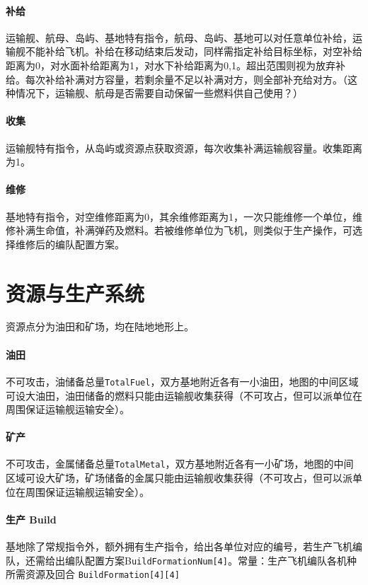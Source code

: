 \documentclass[11pt,a4paper]{article}
\begin{document}
      \paragraph{补给}
        运输舰、航母、岛屿、基地特有指令，航母、岛屿、基地可以对任意单位补给，运输舰不能补给飞机。补给在移动结束后发动，同样需指定补给目标坐标，对空补给距离为0，对水面补给距离为1，对水下补给距离为0,1。超出范围则视为放弃补给。每次补给补满对方容量，若剩余量不足以补满对方，则全部补充给对方。（这种情况下，运输舰、航母是否需要自动保留一些燃料供自己使用？）

      \paragraph{收集}
        运输舰特有指令，从岛屿或资源点获取资源，每次收集补满运输舰容量。收集距离为1。

      \paragraph{维修}
        基地特有指令，对空维修距离为0，其余维修距离为1，一次只能维修一个单位，维修补满生命值，补满弹药及燃料。若被维修单位为飞机，则类似于生产操作，可选择维修后的编队配置方案。


  \section{资源与生产系统}
    资源点分为油田和矿场，均在陆地地形上。

    \paragraph{油田}
      不可攻击，油储备总量\texttt{TotalFuel}，双方基地附近各有一小油田，地图的中间区域可设大油田，油田储备的燃料只能由运输舰收集获得（不可攻占，但可以派单位在周围保证运输舰运输安全）。

    \paragraph{矿产}
      不可攻击，金属储备总量\texttt{TotalMetal}，双方基地附近各有一小矿场，地图的中间区域可设大矿场，矿场储备的金属只能由运输舰收集获得（不可攻占，但可以派单位在周围保证运输舰运输安全）。

    \paragraph{生产 Build}
      基地除了常规指令外，额外拥有生产指令，给出各单位对应的编号，若生产飞机编队，还需给出编队配置方案B\texttt{uildFormationNum[4]}。常量：生产飞机编队各机种所需资源及回合 \texttt{BuildFormation[4][4]}
\end{document}
